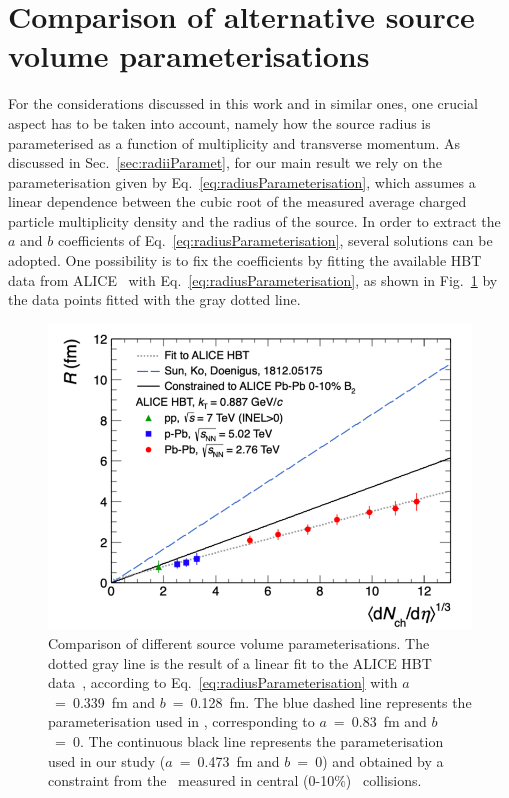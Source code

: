 \documentclass[%
 reprint,
 amsmath,amssymb,
 aps,
]{revtex4-1}
\begin{document}
\appendix
\section{Comparison of alternative source volume parameterisations} \label{appendixA} 
For the considerations discussed in this work and in similar ones, one crucial aspect has to be taken into account, namely how the source radius is parameterised as a function of multiplicity and transverse momentum.
As discussed in Sec.~\ref{sec:radiiParamet}, for our main result we rely on the parameterisation given by Eq.~\ref{eq:radiusParameterisation}, which assumes a linear dependence between the cubic root of the measured average charged particle multiplicity density and the radius of the source. 
In order to extract the $a$ and $b$ coefficients of Eq.~\ref{eq:radiusParameterisation}, several solutions can be adopted. 
One possibility is to fix the coefficients by fitting the available HBT data from ALICE~\cite{Adam:2015vna, Adam:2015pya, Abelev:2012sq} with Eq.~\ref{eq:radiusParameterisation}, as shown in Fig.~\ref{fig:sourceVolume} by the data points fitted with the gray dotted line. 
%
\begin{figure}[!h]
	\begin{center}
		\includegraphics[width=\columnwidth]{HbtRadiusParam.png}
		\caption{Comparison of different source volume parameterisations. The dotted gray line is the result of a linear fit to the ALICE HBT data~\cite{Adam:2015vna, Adam:2015pya, Abelev:2012sq}, according to Eq.~\ref{eq:radiusParameterisation} with $a$~=~0.339~fm and $b$~=~0.128~fm.  
		The blue dashed line represents the parameterisation used in \cite{Sun:2018mqq}, corresponding to $a$~=~0.83~fm and $b$~=~0.
		The continuous black line represents the parameterisation used in our study ($a$~=~0.473~fm and $b$~=~0) and obtained by a constraint from the \btwo~measured in central (0-10$\%$) \PbPb~collisions.}
		\label{fig:sourceVolume}
	\end{center}
\end{figure}
\end{document}
